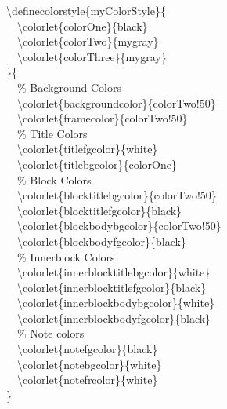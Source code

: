 \documentclass[9pt]{beamer}
\newcommand{\bs}{\textbackslash}   %
\begin{document}
\begin{frame}
\begin{columns}[t]
\begin{minipage}[t]{0.5\textwidth}
      \bs definecolorstyle\{myColorStyle\}\{\\
      \mbox{~~}\bs colorlet\{colorOne\}\{black\}\\
      \mbox{~~}\bs colorlet\{colorTwo\}\{mygray\}\\
      \mbox{~~}\bs colorlet\{colorThree\}\{mygray\}\\
      \}\{\\
      \mbox{~~}\% Background Colors\\
      \mbox{~~}\bs colorlet\{backgroundcolor\}\{colorTwo!50\}\\
      \mbox{~~}\bs colorlet\{framecolor\}\{colorTwo!50\}\\
      \mbox{~~}\% Title Colors\\
      \mbox{~~}\bs colorlet\{titlefgcolor\}\{white\}\\
      \mbox{~~}\bs colorlet\{titlebgcolor\}\{colorOne\}\\
      \mbox{~~}\% Block Colors\\
      \mbox{~~}\bs colorlet\{blocktitlebgcolor\}\{colorTwo!50\}\\
      \mbox{~~}\bs colorlet\{blocktitlefgcolor\}\{black\}\\
      \mbox{~~}\bs colorlet\{blockbodybgcolor\}\{colorTwo!50\}\\
      \mbox{~~}\bs colorlet\{blockbodyfgcolor\}\{black\}\\
      \mbox{~~}\% Innerblock Colors\\
      \mbox{~~}\bs colorlet\{innerblocktitlebgcolor\}\{white\}\\
      \mbox{~~}\bs colorlet\{innerblocktitlefgcolor\}\{black\}\\
      \mbox{~~}\bs colorlet\{innerblockbodybgcolor\}\{white\}\\
      \mbox{~~}\bs colorlet\{innerblockbodyfgcolor\}\{black\}\\
      \mbox{~~}\% Note colors\\
      \mbox{~~}\bs colorlet\{notefgcolor\}\{black\}\\
      \mbox{~~}\bs colorlet\{notebgcolor\}\{white\}\\
      \mbox{~~}\bs colorlet\{notefrcolor\}\{white\}\\
      \}
    \end{minipage}


\end{columns}
\end{frame}
\end{document}
